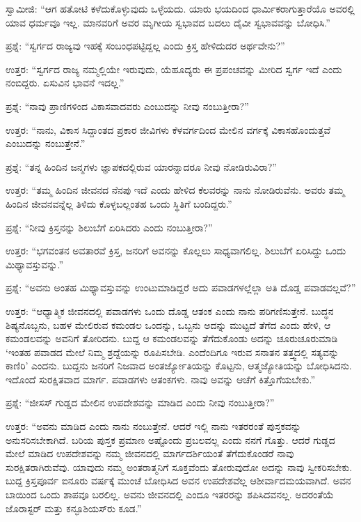 ಸ್ವಾಮೀಜಿ: “ಆಗ ಹತೋಟಿ ಕಳೆದುಕೊಳ್ಳುವುದು ಒಳ್ಳೆಯದು. ಯಾರು ಭಯದಿಂದ ಧಾರ್ಮಿಕರಾಗುತ್ತಾರೆಯೊ ಅವರಲ್ಲಿ ಯಾವ ಧರ್ಮವೂ ಇಲ್ಲ. ಮಾನವರಿಗೆ ಅವರ ಮೃಗೀಯ ಸ್ವಭಾವದ ಬದಲು ದೈವೀ ಸ್ವಭಾವವನ್ನು ಬೋಧಿಸಿ.”

ಪ್ರಶ್ನೆ: “ಸ್ವರ್ಗದ ರಾಜ್ಯವು ಇಹಕ್ಕೆ ಸಂಬಂಧಪಟ್ಟಿದ್ದಲ್ಲ ಎಂದು ಕ್ರಿಸ್ತ ಹೇಳಿದುದರ ಅರ್ಥವೇನು?''

ಉತ್ತರ: “ಸ್ವರ್ಗದ ರಾಜ್ಯ ನಮ್ಮಲ್ಲಿಯೇ ಇರುವುದು, ಯೆಹೂದ್ಯರು ಈ ಪ್ರಪಂಚವನ್ನು ಮೀರಿದ ಸ್ವರ್ಗ ಇದೆ ಎಂದು ನಂಬಿದ್ದರು. ಏಸುವಿನ ಭಾವನೆ ಇದಲ್ಲ.”

ಪ್ರಶ್ನೆ: “ನಾವು ಪ್ರಾಣಿಗಳಿಂದ ವಿಕಾಸವಾದವರು ಎಂಬುದನ್ನು ನೀವು ನಂಬುತ್ತೀರಾ?''

ಉತ್ತರ: “ನಾನು, ವಿಕಾಸ ಸಿದ್ದಾಂತದ ಪ್ರಕಾರ ಜೀವಿಗಳು ಕೆಳವರ್ಗದಿಂದ ಮೇಲಿನ ವರ್ಗಕ್ಕೆ ವಿಕಾಸಹೊಂದುತ್ತವೆ ಎಂಬುದನ್ನು ನಂಬುತ್ತೇನೆ.”

ಪ್ರಶ್ನೆ: “ತನ್ನ ಹಿಂದಿನ ಜನ್ಮಗಳು ಜ್ಞಾಪಕದಲ್ಲಿರುವ ಯಾರನ್ನಾದರೂ ನೀವು ನೋಡಿರುವಿರಾ?”

ಉತ್ತರ: “ತಮ್ಮ ಹಿಂದಿನ ಜೀವನದ ನೆನಪು ಇದೆ ಎಂದು ಹೇಳಿದ ಕೆಲವರನ್ನು ನಾನು ನೋಡಿರುವೆನು. ಅವರು ತಮ್ಮ ಹಿಂದಿನ ಜೀವನವನ್ನೆಲ್ಲ ತಿಳಿದು ಕೊಳ್ಳಬಲ್ಲಂತಹ ಒಂದು ಸ್ಥಿತಿಗೆ ಬಂದಿದ್ದರು.''

ಪ್ರಶ್ನೆ: “ನೀವು ಕ್ರಿಸ್ತನನ್ನು ಶಿಲುಬೆಗೆ ಏರಿಸಿದರು ಎಂದು ನಂಬುತ್ತೀರಾ?”

ಉತ್ತರ: “ಭಗವಂತನ ಅವತಾರವೆ ಕ್ರಿಸ್ತ, ಜನರಿಗೆ ಅವನನ್ನು ಕೊಲ್ಲಲು ಸಾಧ್ಯವಾಗಲಿಲ್ಲ. ಶಿಲುಬೆಗೆ ಏರಿಸಿದ್ದು ಒಂದು ಮಿಥ್ಯಾವಸ್ತುವನ್ನು.”

ಪ್ರಶ್ನೆ: “ಅವನು ಅಂತಹ ಮಿಥ್ಯಾವಸ್ತುವನ್ನು ಉಂಟುಮಾಡಿದ್ದರೆ ಅದು ಪವಾಡಗಳಲ್ಲೆಲ್ಲಾ ಅತಿ ದೊಡ್ಡ ಪವಾಡವಲ್ಲವೆ?”

ಉತ್ತರ: “ಆಧ್ಯಾತ್ಮಿಕ ಜೀವನದಲ್ಲಿ ಪವಾಡಗಳು ಒಂದು ದೊಡ್ಡ ಆತಂಕ ಎಂದು ನಾನು ಪರಿಗಣಿಸುತ್ತೇನೆ. ಬುದ್ಧನ ಶಿಷ್ಯನೊಬ್ಬನು, ಬಹಳ ಮೇಲಿರುವ ಕಮಂಡಲ ಒಂದನ್ನು, ಒಬ್ಬನು ಅದನ್ನು ಮುಟ್ಟದೆ ತೆಗೆದ ಎಂದು ಹೇಳಿ, ಆ ಕಮಂಡಲವನ್ನು ಅವನಿಗೆ ತೋರಿದನು. ಬುದ್ದ ಆ ಕಮಂಡಲವನ್ನು ತೆಗೆದುಕೊಂಡು ಅದನ್ನು ಚೂರುಚೂರುಮಾಡಿ `ಇಂತಹ ಪವಾಡದ ಮೇಲೆ ನಿಮ್ಮ ಶ್ರದ್ದೆಯನ್ನು ರೂಪಿಸಬೇಡಿ. ಎಂದೆಂದಿಗೂ ಇರುವ ಸನಾತನ ತತ್ತ್ವದಲ್ಲಿ ಸತ್ಯವನ್ನು ಕಾಣಿರಿ' ಎಂದನು. ಬುದ್ದನು ಜನರಿಗೆ ನಿಜವಾದ ಅಂತರ್ಜ್ಯೋತಿಯನ್ನು ಕೊಟ್ಟನು, ಆತ್ಮಜ್ಯೋತಿಯನ್ನು ಬೋಧಿಸಿದನು. ಇದೊಂದೆ ಸುರಕ್ಷಿತವಾದ ಮಾರ್ಗ. ಪವಾಡಗಳು ಆತಂಕಗಳು. ನಾವು ಅವನ್ನು ಆಚೆಗೆ ಕಿತ್ತೊಗೆಯಬೇಕು.”

ಪ್ರಶ್ನೆ: “ಜೀಸಸ್ ಗುಡ್ಡದ ಮೇಲಿನ ಉಪದೇಶವನ್ನು ಮಾಡಿದ ಎಂದು ನೀವು ನಂಬುತ್ತೀರಾ?”

ಉತ್ತರ: “ಅವನು ಮಾಡಿದ ಎಂದು ನಾನು ನಂಬುತ್ತೇನೆ. ಆದರೆ ಇಲ್ಲಿ ನಾನು ಇತರರಂತೆ ಪುಸ್ತಕವನ್ನು ಅನುಸರಿಸಬೇಕಾಗಿದೆ. ಬರಿಯ ಪುಸ್ತಕ ಪ್ರಮಾಣ ಅಷ್ಟೊಂದು ಪ್ರಬಲವಲ್ಲ ಎಂದು ನನಗೆ ಗೊತ್ತು. ಆದರೆ ಗುಡ್ಡದ ಮೇಲೆ ಮಾಡಿದ ಉಪದೇಶವನ್ನು ನಮ್ಮ ಜೀವನದಲ್ಲಿ ಮಾರ್ಗದರ್ಶಿಯಂತೆ ತೆಗೆದುಕೊಂಡರೆ ನಾವು ಸುರಕ್ಷಿತರಾಗಿರುವೆವು. ಯಾವುದು ನಮ್ಮ ಅಂತರಾತ್ಮನಿಗೆ ಸೂಕ್ತವೆಂದು ತೋರುವುದೋ ಅದನ್ನು ನಾವು ಸ್ವೀಕರಿಸಬೇಕು. ಬುದ್ದ ಕ್ರಿಸ್ತಪೂರ್ವ ಐನೂರು ವರ್ಷಕ್ಕೆ ಮುಂಚೆ ಬೋಧಿಸಿದ ಅವನ ಉಪದೇಶವೆಲ್ಲ ಆಶೀರ್ವಾದಮಯವಾಗಿದೆ. ಅವನ ಬಾಯಿಂದ ಒಂದು ಶಾಪವೂ ಬರಲಿಲ್ಲ. ಅವನು ಜೀವನದಲ್ಲಿ ಎಂದೂ ಇತರರನ್ನು ಶಪಿಸಿದವನಲ್ಲ. ಅದರಂತೆಯೆ ಜೊರಾಸ್ಟರ್‌ ಮತ್ತು ಕನ್ಫೂಶಿಯಸ್‌ರು ಕೂಡ.”


